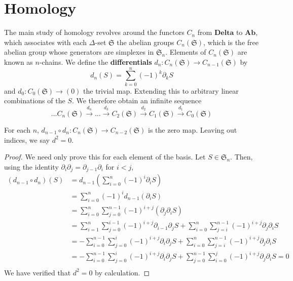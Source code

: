\chapter{Homology}

The main study of homology revolves around the functors $C_n$ from $\textbf{Delta}$ to $\textbf{Ab}$, which associates with each $\Delta$-set $\mathfrak{S}$ the abelian groups $C_n(\mathfrak{S})$, which is the free abelian group whose generators are simplexes in $\mathfrak{S}_n$. Elements of $C_n(\mathfrak{S})$ are known as $n$-chains. We define the {\bf differentials} $d_n: C_n(\mathfrak{S}) \to C_{n-1}(\mathfrak{S})$ by
%
\[ d_n(S) = \sum_{k = 0}^n (-1)^k \partial_k S \]
%
and $d_0: C_0(\mathfrak{S}) \to (0)$ the trivial map. Extending this to arbitrary linear combinations of the $S$. We therefore obtain an infinite sequence
%
\[ \dots C_n(\mathfrak{S}) \xrightarrow{d_n} \dots \xrightarrow{d_3} C_2(\mathfrak{S}) \xrightarrow{d_2} C_1(\mathfrak{S}) \xrightarrow{d_1} C_0(\mathfrak{S}) \]

\begin{lemma}
    For each $n$, $d_{n-1} \circ d_n: C_n(\mathfrak{S}) \to C_{n-2}(\mathfrak{S})$ is the zero map. Leaving out indices, we say $d^2 = 0$.
\end{lemma}
\begin{proof}
    We need only prove this for each element of the basis. Let $S \in \mathfrak{S}_n$. Then, using the identity $\partial_i \partial_j = \partial_{j-1} \partial_i$ for $i < j$,
    \begin{align*}
        (d_{n-1} \circ d_n)(S) &= d_{n-1} \left( \sum_{i = 0}^n (-1)^i \partial_i S \right)\\
        &= \sum_{i = 0}^n (-1)^i d_{n-1}(\partial_i S)\\
        &= \sum_{i = 0}^n \sum_{j = 0}^{n-1} (-1)^{i+j} (\partial_j \partial_i S)\\
        &= \sum_{i = 1}^n \sum_{j = 0}^{i-1} (-1)^{i+j} \partial_{i-1} \partial_j S + \sum_{i = 0}^n \sum_{j = i}^{n-1} (-1)^{i + j} \partial_j \partial_i S\\
        &= - \sum_{i = 0}^{n-1} \sum_{j = 0}^i (-1)^{i+j} \partial_i \partial_j S + \sum_{i = 0}^n \sum_{j = i}^{n-1} (-1)^{i+j} \partial_j \partial_i S\\
        &= - \sum_{i = 0}^{n-1} \sum_{j = 0}^i (-1)^{i+j} \partial_i \partial_j S + \sum_{j = 0}^{n-1} \sum_{i = 0}^j (-1)^{i+j} \partial_j \partial_i S = 0\\
    \end{align*}
    We have verified that $d^2 = 0$ by calculation.
\end{proof}

